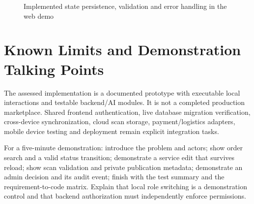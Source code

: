 \begin{figure}[htbp]\centering
{}
\caption{Implemented state persistence, validation and error handling in the web demo}
\end{figure}

\clearpage
\section{Known Limits and Demonstration Talking Points}
The assessed implementation is a documented prototype with executable local
interactions and testable backend/AI modules. It is not a completed production
marketplace. Shared frontend authentication, live database migration verification,
cross-device synchronization, cloud scan storage, payment/logistics adapters,
mobile device testing and deployment remain explicit integration tasks.

For a five-minute demonstration: introduce the problem and actors; show order
search and a valid status transition; demonstrate a service edit that survives
reload; show scan validation and private publication metadata; demonstrate an
admin decision and its audit event; finish with the test summary and the
requirement-to-code matrix. Explain that local role switching is a demonstration
control and that backend authorization must independently enforce permissions.
